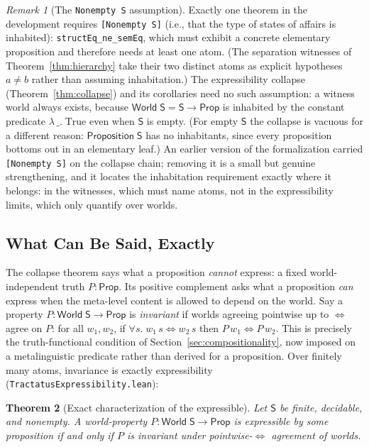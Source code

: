 \documentclass[jsl,bibother]{asl}
\newtheorem{theorem}{Theorem}[section]
\theoremstyle{definition}
\theoremstyle{remark}
\newtheorem{remark}[theorem]{Remark}
\newcommand{\Sach}{\mathsf{S}}
\newcommand{\World}{\mathsf{World}}
\newcommand{\Prop}{\mathsf{Prop}}
\begin{document}
\begin{remark}[The \texttt{Nonempty S} assumption]
\label{rem:nonempty}
Exactly one theorem in the development requires
\texttt{[Nonempty S]} (i.e., that the type of states of affairs
is inhabited): \texttt{structEq\_ne\_semEq}, which must exhibit
a concrete elementary proposition and therefore needs at least
one atom.  (The separation witnesses of
Theorem~\ref{thm:hierarchy} take their two distinct atoms as
explicit hypotheses $a \neq b$ rather than assuming
inhabitation.)  The expressibility collapse
(Theorem~\ref{thm:collapse}) and its corollaries need no such
assumption: a witness world always exists, because
$\mathsf{World}\;\Sach = \Sach \to \Prop$ is inhabited by the
constant predicate $\lambda\,\_.\;\mathrm{True}$ even when
$\Sach$ is empty.  (For empty $\Sach$ the collapse is vacuous
for a different reason: $\mathsf{Proposition}\;\Sach$ has no
inhabitants, since every proposition bottoms out in an elementary
leaf.)  An earlier version of the formalization carried
\texttt{[Nonempty S]} on the collapse chain; removing it is a
small but genuine strengthening, and it locates the inhabitation
requirement exactly where it belongs: in the witnesses, which
must name atoms, not in the expressibility limits, which only
quantify over worlds.
\end{remark}

\subsection{What Can Be Said, Exactly}
\label{sec:whatcanbesaid}

The collapse theorem says what a proposition \emph{cannot}
express: a fixed world-independent truth $P : \Prop$.  Its
positive complement asks what a proposition \emph{can} express
when the meta-level content is allowed to depend on the world.
Say a property $P : \World\;\Sach \to \Prop$ is
\emph{invariant} if worlds agreeing pointwise up to $\iff$ agree
on $P$: for all $w_1, w_2$, if $\forall s.\; w_1\,s \iff w_2\,s$
then $P\,w_1 \iff P\,w_2$.  This is precisely the
truth-functional condition of
Section~\ref{sec:compositionality}, now imposed on a
metalinguistic predicate rather than derived for a proposition.
Over finitely many atoms, invariance is exactly expressibility
(\texttt{TractatusExpressibility.lean}):

\begin{theorem}[Exact characterization of the expressible]
\label{thm:expressible}
Let $\Sach$ be finite, decidable, and nonempty.  A world-property
$P : \World\;\Sach \to \Prop$ is expressible by some proposition
if and only if $P$ is invariant under pointwise-$\iff$ agreement
of worlds.
\end{theorem}
\end{document}
